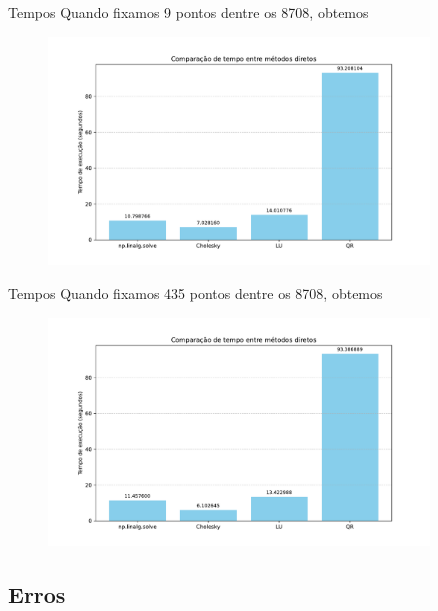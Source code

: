 \documentclass[11pt]{beamer}
\begin{document}
\begin{frame}{Tempos}
    Quando fixamos 9 pontos dentre os 8708, obtemos
    \begin{figure}[htb]
        \label{fig:tempos_diretos_9pontos}
        \centering
        \includegraphics[width=0.9\textwidth]{../figs/fig5.pdf}
    \end{figure}
\end{frame}

\begin{frame}{Tempos}
    Quando fixamos 435 pontos dentre os 8708, obtemos
    \begin{figure}[htb]
        \label{fig:tempos_diretos_435pontos}
        \centering
        \includegraphics[width=0.9\textwidth]{../figs/fig11.pdf}
    \end{figure}
\end{frame}

\subsection{Erros}
\end{document}
